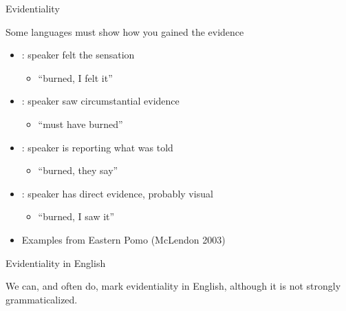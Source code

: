 \begin{frame}{Evidentiality}

 Some languages must show how you gained the evidence
\begin{itemize}

\item  {}:  speaker felt the sensation
  \begin{itemize}
  \item {} ``burned, I felt it''
  \end{itemize}
\item  {}: speaker saw circumstantial evidence 
  \begin{itemize}
  \item  {}  ``must have burned''
  \end{itemize}
\item  {}:   speaker is reporting what was told
  \begin{itemize}
  \item  {} ``burned, they say''
  \end{itemize}
\item  {}:   speaker has direct evidence, probably visual 
  \begin{itemize}
  \item {} ``burned, I saw it''
  \end{itemize}
\item Examples from Eastern Pomo (McLendon 2003)
\end{itemize}

\end{frame}

\begin{frame}{Evidentiality in English}

We can, and often do, mark evidentiality in English, although it is
not strongly grammaticalized.

\begin{exe}
\ex {}
\ex {}
\ex {}
\ex {}
\ex {}
\ex {}
\ex {}
\end{exe}


\end{frame}

